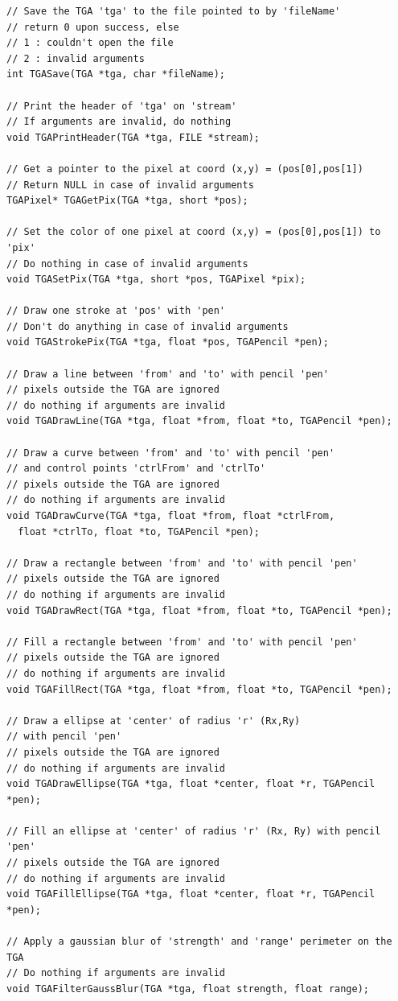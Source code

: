 \documentclass[12pt, a4paper]{article}
\begin{document}
\begin{scriptsize}
\begin{ttfamily}
\begin{lstlisting}
// Save the TGA 'tga' to the file pointed to by 'fileName'
// return 0 upon success, else
// 1 : couldn't open the file
// 2 : invalid arguments
int TGASave(TGA *tga, char *fileName);

// Print the header of 'tga' on 'stream'
// If arguments are invalid, do nothing
void TGAPrintHeader(TGA *tga, FILE *stream);

// Get a pointer to the pixel at coord (x,y) = (pos[0],pos[1])
// Return NULL in case of invalid arguments
TGAPixel* TGAGetPix(TGA *tga, short *pos);

// Set the color of one pixel at coord (x,y) = (pos[0],pos[1]) to 'pix'
// Do nothing in case of invalid arguments
void TGASetPix(TGA *tga, short *pos, TGAPixel *pix);

// Draw one stroke at 'pos' with 'pen'
// Don't do anything in case of invalid arguments
void TGAStrokePix(TGA *tga, float *pos, TGAPencil *pen);

// Draw a line between 'from' and 'to' with pencil 'pen'
// pixels outside the TGA are ignored
// do nothing if arguments are invalid
void TGADrawLine(TGA *tga, float *from, float *to, TGAPencil *pen);
  
// Draw a curve between 'from' and 'to' with pencil 'pen'
// and control points 'ctrlFrom' and 'ctrlTo'
// pixels outside the TGA are ignored
// do nothing if arguments are invalid
void TGADrawCurve(TGA *tga, float *from, float *ctrlFrom, 
  float *ctrlTo, float *to, TGAPencil *pen);
  
// Draw a rectangle between 'from' and 'to' with pencil 'pen'
// pixels outside the TGA are ignored
// do nothing if arguments are invalid
void TGADrawRect(TGA *tga, float *from, float *to, TGAPencil *pen);

// Fill a rectangle between 'from' and 'to' with pencil 'pen'
// pixels outside the TGA are ignored
// do nothing if arguments are invalid
void TGAFillRect(TGA *tga, float *from, float *to, TGAPencil *pen);

// Draw a ellipse at 'center' of radius 'r' (Rx,Ry) 
// with pencil 'pen' 
// pixels outside the TGA are ignored
// do nothing if arguments are invalid
void TGADrawEllipse(TGA *tga, float *center, float *r, TGAPencil *pen);

// Fill an ellipse at 'center' of radius 'r' (Rx, Ry) with pencil 'pen'
// pixels outside the TGA are ignored
// do nothing if arguments are invalid
void TGAFillEllipse(TGA *tga, float *center, float *r, TGAPencil *pen);

// Apply a gaussian blur of 'strength' and 'range' perimeter on the TGA
// Do nothing if arguments are invalid 
void TGAFilterGaussBlur(TGA *tga, float strength, float range);


\end{lstlisting}
\end{ttfamily}
\end{scriptsize}
\end{document}
